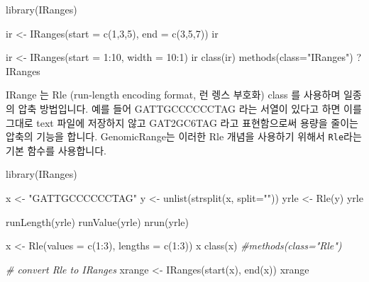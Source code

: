 \documentclass[
]{book}
\newenvironment{Shaded}{\begin{snugshade}}{\end{snugshade}}
\newcommand{\AttributeTok}[1]{\textcolor[rgb]{0.77,0.63,0.00}{#1}}
\newcommand{\CommentTok}[1]{\textcolor[rgb]{0.56,0.35,0.01}{\textit{#1}}}
\newcommand{\DecValTok}[1]{\textcolor[rgb]{0.00,0.00,0.81}{#1}}
\newcommand{\FunctionTok}[1]{\textcolor[rgb]{0.00,0.00,0.00}{#1}}
\newcommand{\NormalTok}[1]{#1}
\newcommand{\OtherTok}[1]{\textcolor[rgb]{0.56,0.35,0.01}{#1}}
\newcommand{\SpecialCharTok}[1]{\textcolor[rgb]{0.00,0.00,0.00}{#1}}
\newcommand{\StringTok}[1]{\textcolor[rgb]{0.31,0.60,0.02}{#1}}
\begin{document}
\begin{Shaded}
\begin{Highlighting}[]
\FunctionTok{library}\NormalTok{(IRanges)}

\NormalTok{ir }\OtherTok{\textless{}{-}} \FunctionTok{IRanges}\NormalTok{(}\AttributeTok{start =} \FunctionTok{c}\NormalTok{(}\DecValTok{1}\NormalTok{,}\DecValTok{3}\NormalTok{,}\DecValTok{5}\NormalTok{), }\AttributeTok{end =} \FunctionTok{c}\NormalTok{(}\DecValTok{3}\NormalTok{,}\DecValTok{5}\NormalTok{,}\DecValTok{7}\NormalTok{))}
\NormalTok{ir}

\NormalTok{ir }\OtherTok{\textless{}{-}} \FunctionTok{IRanges}\NormalTok{(}\AttributeTok{start =} \DecValTok{1}\SpecialCharTok{:}\DecValTok{10}\NormalTok{, }\AttributeTok{width =} \DecValTok{10}\SpecialCharTok{:}\DecValTok{1}\NormalTok{)}
\NormalTok{ir}
\FunctionTok{class}\NormalTok{(ir)}
\FunctionTok{methods}\NormalTok{(}\AttributeTok{class=}\StringTok{"IRanges"}\NormalTok{)}
\NormalTok{?IRanges}
\end{Highlighting}
\end{Shaded}

IRange 는 Rle (run-length encoding format, 런 렝스 부호화) class 를 사용하며 일종의 압축 방법입니다. 예를 들어 GATTGCCCCCCTAG 라는 서열이 있다고 하면 이를 그대로 text 파일에 저장하지 않고 GAT2GC6TAG 라고 표현함으로써 용량을 줄이는 압축의 기능을 합니다. GenomicRange는 이러한 Rle 개념을 사용하기 위해서 \texttt{Rle}라는 기본 함수를 사용합니다.

\begin{Shaded}
\begin{Highlighting}[]
\FunctionTok{library}\NormalTok{(IRanges)}

\NormalTok{x }\OtherTok{\textless{}{-}} \StringTok{"GATTGCCCCCCTAG"}
\NormalTok{y }\OtherTok{\textless{}{-}} \FunctionTok{unlist}\NormalTok{(}\FunctionTok{strsplit}\NormalTok{(x, }\AttributeTok{split=}\StringTok{""}\NormalTok{))}
\NormalTok{yrle }\OtherTok{\textless{}{-}} \FunctionTok{Rle}\NormalTok{(y)}
\NormalTok{yrle}

\FunctionTok{runLength}\NormalTok{(yrle)}
\FunctionTok{runValue}\NormalTok{(yrle)}
\FunctionTok{nrun}\NormalTok{(yrle)}

\NormalTok{x }\OtherTok{\textless{}{-}} \FunctionTok{Rle}\NormalTok{(}\AttributeTok{values =} \FunctionTok{c}\NormalTok{(}\DecValTok{1}\SpecialCharTok{:}\DecValTok{3}\NormalTok{), }\AttributeTok{lengths =} \FunctionTok{c}\NormalTok{(}\DecValTok{1}\SpecialCharTok{:}\DecValTok{3}\NormalTok{))}
\NormalTok{x}
\FunctionTok{class}\NormalTok{(x)}
\CommentTok{\#methods(class="Rle")}

\CommentTok{\# convert Rle to IRanges}
\NormalTok{xrange }\OtherTok{\textless{}{-}} \FunctionTok{IRanges}\NormalTok{(}\FunctionTok{start}\NormalTok{(x), }\FunctionTok{end}\NormalTok{(x))}
\NormalTok{xrange}
\end{Highlighting}
\end{Shaded}
\end{document}
